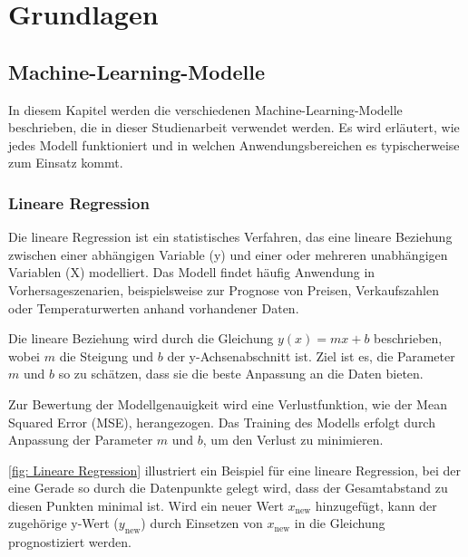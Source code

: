 \section{Grundlagen}

\subsection{Machine-Learning-Modelle}\label{sec: Machine Learning Modelle}
In diesem Kapitel werden die verschiedenen Machine-Learning-Modelle beschrieben, die in dieser Studienarbeit verwendet werden. Es wird erläutert, wie jedes Modell funktioniert und in welchen Anwendungsbereichen es typischerweise zum Einsatz kommt.

\subsubsection{Lineare Regression}\label{sec: Linear Regression}
Die lineare Regression ist ein statistisches Verfahren, das eine lineare Beziehung zwischen einer abhängigen Variable (y) und einer oder mehreren unabhängigen Variablen (X) modelliert. Das Modell findet häufig Anwendung in Vorhersageszenarien, beispielsweise zur Prognose von Preisen, Verkaufszahlen oder Temperaturwerten anhand vorhandener Daten. 

Die lineare Beziehung wird durch die Gleichung \(y(x) = mx + b\) beschrieben, wobei \(m\) die Steigung und \(b\) der y-Achsenabschnitt ist. Ziel ist es, die Parameter \(m\) und \(b\) so zu schätzen, dass sie die beste Anpassung an die Daten bieten. 

Zur Bewertung der Modellgenauigkeit wird eine Verlustfunktion, wie der Mean Squared Error (MSE), herangezogen. Das Training des Modells erfolgt durch Anpassung der Parameter \(m\) und \(b\), um den Verlust zu minimieren.

\autoref{fig: Lineare Regression} illustriert ein Beispiel für eine lineare Regression, bei der eine Gerade so durch die Datenpunkte gelegt wird, dass der Gesamtabstand zu diesen Punkten minimal ist. Wird ein neuer Wert \(x_{\text{new}}\) hinzugefügt, kann der zugehörige y-Wert (\(y_{\text{new}}\)) durch Einsetzen von \(x_{\text{new}}\) in die Gleichung prognostiziert werden.

